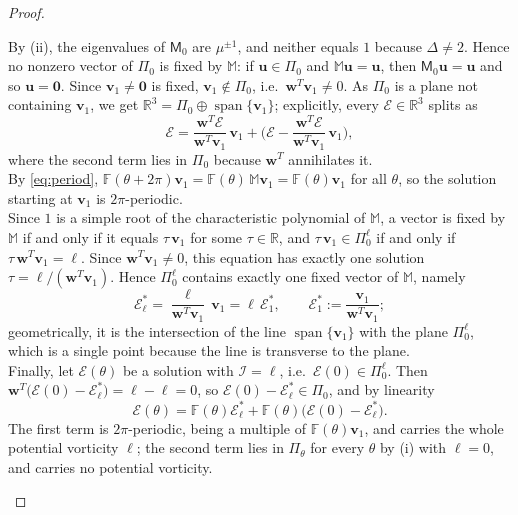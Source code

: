 \documentclass[reqno]{amsart}
\newcommand{\F}{\mathbb{F}}
\begin{document}
\begin{proof}
\begin{enumerate}
By (ii), the eigenvalues of ${\mathsf M}_0$ are $\mu^{\pm1}$, and neither equals $1$ because $\Delta\neq2$. Hence no nonzero vector of $\Pi_0$ is fixed by $\mathbb M$: if $\mathbf u\in\Pi_0$ and $\mathbb M\mathbf u=\mathbf u$, then ${\mathsf M}_0\mathbf u=\mathbf u$ and so $\mathbf u=\mathbf 0$. Since $\mathbf v_1\neq\mathbf 0$ is fixed, $\mathbf v_1\notin\Pi_0$, i.e.\ $\mathbf w^T\mathbf v_1\neq0$. As $\Pi_0$ is a plane not containing $\mathbf v_1$, we get $\mathbb R^3=\Pi_0\oplus\operatorname{span}\{\mathbf v_1\}$; explicitly, every $\boldsymbol{\mathcal E}\in\mathbb R^3$ splits as
\[
\boldsymbol{\mathcal E}=\frac{\mathbf w^T\boldsymbol{\mathcal E}}{\mathbf w^T\mathbf v_1}\,\mathbf v_1+\Big(\boldsymbol{\mathcal E}-\frac{\mathbf w^T\boldsymbol{\mathcal E}}{\mathbf w^T\mathbf v_1}\,\mathbf v_1\Big),
\]
where the second term lies in $\Pi_0$ because $\mathbf w^T$ annihilates it.\\ By \eqref{eq:period}, $\F(\theta+2\pi)\mathbf v_1=\F(\theta)\,\mathbb M\mathbf v_1=\F(\theta)\mathbf v_1$ for all $\theta$, so the solution starting at $\mathbf v_1$ is $2\pi$-periodic.
\\ Since $1$ is a simple root of the characteristic polynomial of $\mathbb M$, a vector is fixed by $\mathbb M$ if and only if it equals $\tau\,\mathbf v_1$ for some $\tau\in\mathbb R$, and $\tau\,\mathbf v_1\in\Pi^\ell_0$ if and only if $\tau\,\mathbf w^T\mathbf v_1=\ell$. Since $\mathbf w^T\mathbf v_1\neq0$, this equation has exactly one solution $\tau=\ell/(\mathbf w^T\mathbf v_1)$. Hence $\Pi^\ell_0$ contains exactly one fixed vector of $\mathbb M$, namely
\[
\boldsymbol{\mathcal E}^*_\ell=\frac{\ell}{\mathbf w^T\mathbf v_1}\,\mathbf v_1=\ell\,\boldsymbol{\mathcal E}^*_1,\qquad \boldsymbol{\mathcal E}^*_1:=\frac{\mathbf v_1}{\mathbf w^T\mathbf v_1};
\]
geometrically, it is the intersection of the line $\operatorname{span}\{\mathbf v_1\}$ with the plane $\Pi^\ell_0$, which is a single point because the line is transverse to the plane.\\ Finally, let $\boldsymbol{\mathcal E}(\theta)$ be a solution with $\mathcal I=\ell$, i.e.\ $\boldsymbol{\mathcal E}(0)\in\Pi^\ell_0$. Then $\mathbf w^T\big(\boldsymbol{\mathcal E}(0)-\boldsymbol{\mathcal E}^*_\ell\big)=\ell-\ell=0$, so $\boldsymbol{\mathcal E}(0)-\boldsymbol{\mathcal E}^*_\ell\in\Pi_0$, and by linearity
\[
\boldsymbol{\mathcal E}(\theta)=\F(\theta)\boldsymbol{\mathcal E}^*_\ell+\F(\theta)\big(\boldsymbol{\mathcal E}(0)-\boldsymbol{\mathcal E}^*_\ell\big).
\]
The first term is $2\pi$-periodic, being a multiple of $\F(\theta)\mathbf v_1$, and carries the whole potential vorticity $\ell$; the second term lies in $\Pi_\theta$ for every $\theta$ by (i) with $\ell=0$, and carries no potential vorticity.

\end{enumerate}
\end{proof}
\end{document}
